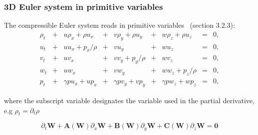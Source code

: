 \documentclass{article}
\begin{document}
\subsubsection*{3D Euler system in primitive variables}
The compressible Euler system reads in primitive variables~\cite{toro} (section 3.2.3):\\

\begin{equation}
  \begin{array}{ccccccccc}
    \rho_t & + & u\rho_x+\rho u_x & + & v\rho_y+\rho u_y & + & w\rho_z+\rho u_z & = &0,\\
    u_t    & + & u u_x + p_x/\rho & + & v u_y            & + & w u_z            & = &0,\\
    v_t    & + & u v_x            & + & v v_y + p_y/\rho & + & w v_z            & = &0,\\
    w_t    & + & u w_x            & + & v w_y            & + & w w_z + p_z/\rho & = &0,\\
    p_t    & + & \gamma p u_x + u p_x & + & \gamma p v_y + v p_y & + & \gamma p w_z + w p_z & = &0,
  \end{array}
\end{equation}

where the subscript variable designates the variable used in the partial derivative, e.g $\rho_t = \partial_t \rho$

\begin{equation}
  \partial_t \mathbf{W} + \mathbf{A(W)} \partial_x \mathbf{W} + \mathbf{B(W)} \partial_y \mathbf{W} + \mathbf{C(W)} \partial_z \mathbf{W} = \mathbf{0}
\end{equation}
\end{document}
